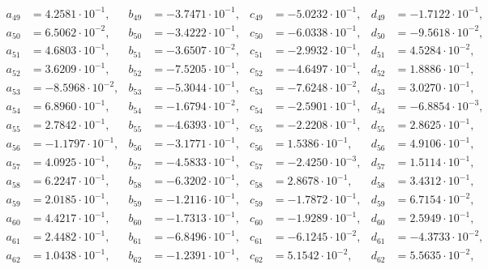 \begin{align*}
  a_{ 49 } &= 4.2581 \cdot 10^{ -1 }, & b_{ 49 } &= -3.7471 \cdot 10^{ -1 }, & c_{ 49 } &= -5.0232 \cdot 10^{ -1 }, & d_{ 49 } &= -1.7122 \cdot 10^{ -1 }, \\ 
  a_{ 50 } &= 6.5062 \cdot 10^{ -2 }, & b_{ 50 } &= -3.4222 \cdot 10^{ -1 }, & c_{ 50 } &= -6.0338 \cdot 10^{ -1 }, & d_{ 50 } &= -9.5618 \cdot 10^{ -2 }, \\ 
  a_{ 51 } &= 4.6803 \cdot 10^{ -1 }, & b_{ 51 } &= -3.6507 \cdot 10^{ -2 }, & c_{ 51 } &= -2.9932 \cdot 10^{ -1 }, & d_{ 51 } &= 4.5284 \cdot 10^{ -2 }, \\ 
  a_{ 52 } &= 3.6209 \cdot 10^{ -1 }, & b_{ 52 } &= -7.5205 \cdot 10^{ -1 }, & c_{ 52 } &= -4.6497 \cdot 10^{ -1 }, & d_{ 52 } &= 1.8886 \cdot 10^{ -1 }, \\ 
  a_{ 53 } &= -8.5968 \cdot 10^{ -2 }, & b_{ 53 } &= -5.3044 \cdot 10^{ -1 }, & c_{ 53 } &= -7.6248 \cdot 10^{ -2 }, & d_{ 53 } &= 3.0270 \cdot 10^{ -1 }, \\ 
  a_{ 54 } &= 6.8960 \cdot 10^{ -1 }, & b_{ 54 } &= -1.6794 \cdot 10^{ -2 }, & c_{ 54 } &= -2.5901 \cdot 10^{ -1 }, & d_{ 54 } &= -6.8854 \cdot 10^{ -3 }, \\ 
  a_{ 55 } &= 2.7842 \cdot 10^{ -1 }, & b_{ 55 } &= -4.6393 \cdot 10^{ -1 }, & c_{ 55 } &= -2.2208 \cdot 10^{ -1 }, & d_{ 55 } &= 2.8625 \cdot 10^{ -1 }, \\ 
  a_{ 56 } &= -1.1797 \cdot 10^{ -1 }, & b_{ 56 } &= -3.1771 \cdot 10^{ -1 }, & c_{ 56 } &= 1.5386 \cdot 10^{ -1 }, & d_{ 56 } &= 4.9106 \cdot 10^{ -1 }, \\ 
  a_{ 57 } &= 4.0925 \cdot 10^{ -1 }, & b_{ 57 } &= -4.5833 \cdot 10^{ -1 }, & c_{ 57 } &= -2.4250 \cdot 10^{ -3 }, & d_{ 57 } &= 1.5114 \cdot 10^{ -1 }, \\ 
  a_{ 58 } &= 6.2247 \cdot 10^{ -1 }, & b_{ 58 } &= -6.3202 \cdot 10^{ -1 }, & c_{ 58 } &= 2.8678 \cdot 10^{ -1 }, & d_{ 58 } &= 3.4312 \cdot 10^{ -1 }, \\ 
  a_{ 59 } &= 2.0185 \cdot 10^{ -1 }, & b_{ 59 } &= -1.2116 \cdot 10^{ -1 }, & c_{ 59 } &= -1.7872 \cdot 10^{ -1 }, & d_{ 59 } &= 6.7154 \cdot 10^{ -2 }, \\ 
  a_{ 60 } &= 4.4217 \cdot 10^{ -1 }, & b_{ 60 } &= -1.7313 \cdot 10^{ -1 }, & c_{ 60 } &= -1.9289 \cdot 10^{ -1 }, & d_{ 60 } &= 2.5949 \cdot 10^{ -1 }, \\ 
  a_{ 61 } &= 2.4482 \cdot 10^{ -1 }, & b_{ 61 } &= -6.8496 \cdot 10^{ -1 }, & c_{ 61 } &= -6.1245 \cdot 10^{ -2 }, & d_{ 61 } &= -4.3733 \cdot 10^{ -2 }, \\ 
  a_{ 62 } &= 1.0438 \cdot 10^{ -1 }, & b_{ 62 } &= -1.2391 \cdot 10^{ -1 }, & c_{ 62 } &= 5.1542 \cdot 10^{ -2 }, & d_{ 62 } &= 5.5635 \cdot 10^{ -2 }, \\ 

\end{align*}
